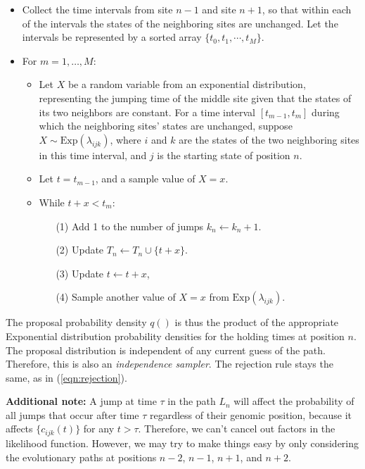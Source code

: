 \documentclass[11pt]{article}
\begin{document}
\begin{itemize}
\item Collect the time intervals from site $n-1$ and site $n+1$, so
  that within each of the intervals the states of the neighboring
  sites are unchanged. Let the intervals be represented by a sorted
  array $\{t_0, t_1, \cdots, t_M\}$.
\item For $m = 1, \ldots, M$:
  \begin{itemize}
  \item Let $X$ be a random variable from an exponential
    distribution, representing the jumping time of the middle site
    given that the states of its two neighbors are constant.  For a time
    interval $[t_{m-1}, t_m]$ during which the neighboring sites' states
    are unchanged, suppose $X\sim \text{Exp}(\lambda_{ijk})$, where $i$
    and $k$ are the states of the two neighboring sites in this time
    interval, and $j$ is the starting state of position $n$.
  \item Let $t = t_{m-1}$, and a sample value of $X=x$.
  \item While $t +x < t_m$:
    \begin{enumerate}
    \item[(1)] Add 1 to the number of jumps $k_n \leftarrow k_n +1$.
    \item[(2)] Update $T_n \leftarrow T_n\cup\{t+x\}$.
    \item[(3)] Update $t \leftarrow  t+x$,
    \item[(4)] Sample another value of $X=x$ from $\text{Exp}(\lambda_{ijk})$.
    \end{enumerate}
  \end{itemize}
\end{itemize}

The proposal probability density $q()$ is thus the product of the
appropriate Exponential distribution probability densities for the
holding times at position $n$. The proposal distribution is
independent of any current guess of the path. Therefore, this is also
an \textit{independence sampler}. The rejection rule stays the same,
as in (\ref{eqn:rejection}).


\textbf{Additional note:} A jump at time $\tau$ in the path $L_{n}$
will affect the probability of all jumps that occur after time $\tau$
regardless of their genomic position, because it affects
$\{c_{ijk}(t)\}$ for any $t > \tau$. Therefore, we can't cancel out
factors in the likelihood function. However, we may try to make things
easy by only considering the evolutionary paths at positions $n-2$,
$n-1$, $n+1$, and $n+2$.
\end{document}
